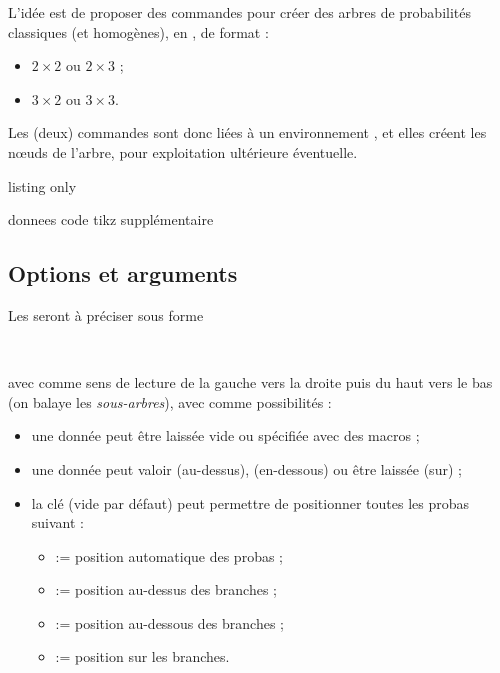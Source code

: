 \begin{tipblock}
L'idée est de proposer des commandes pour créer des arbres de probabilités classiques (et homogènes), en \TikZ, de format :

\begin{itemize}
	\item $2\times2$ ou $2\times3$ ;
	\item $3\times2$ ou $3\times3$.
\end{itemize}

Les (deux) commandes sont donc liées à un environnement , et elles créent les nœuds de l'arbre, pour exploitation ultérieure éventuelle.
\end{tipblock}

\begin{PresCodeTexPL}{listing only}

\begin{EnvArbreProbasTikz}[options]{donnees}
	code tikz supplémentaire
\end{EnvArbreProbasTikz}
\end{PresCodeTexPL}

\subsection{Options et arguments}

\begin{noteblock}
Les  seront à préciser sous forme

\hfill{}\hfill~

avec comme \og sens de lecture \fg{} de la gauche vers la droite puis du haut vers le bas (on balaye les \textit{sous-arbres}), avec comme possibilités :

\begin{itemize}
	\item {} une donnée  peut être laissée vide ou spécifiée avec des \textsf{macros} ;
	\item une donnée  peut valoir  (au-dessus),  (en-dessous) ou être laissée  (sur) ;
	\item {} la clé  (vide par défaut) peut permettre de positionner toutes les probas suivant :
	\begin{itemize}
		\item {} := position automatique des probas ;
		\item {} := position au-dessus des branches ;
		\item {} := position au-dessous des branches ;
		\item {} := position sur les branches.
	\end{itemize}
\end{itemize}
\vspace*{-\baselineskip}\leavevmode
\end{noteblock}

